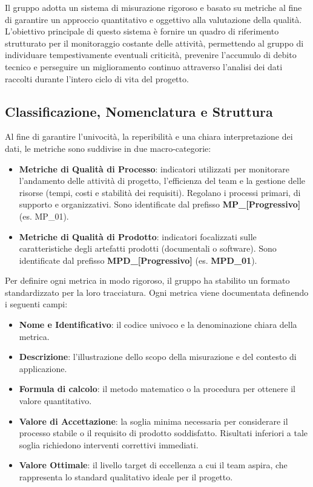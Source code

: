 \documentclass[12pt, a4paper]{article}
\begin{document}
Il gruppo adotta un sistema di misurazione rigoroso e basato su metriche al fine di garantire un approccio quantitativo e oggettivo alla valutazione della qualità. L'obiettivo principale di questo sistema è fornire un quadro di riferimento strutturato per il monitoraggio costante delle attività, permettendo al gruppo di individuare tempestivamente eventuali criticità, prevenire l'accumulo di debito tecnico e perseguire un miglioramento continuo attraverso l'analisi dei dati raccolti durante l'intero ciclo di vita del progetto.

\subsection{Classificazione, Nomenclatura e Struttura}
Al fine di garantire l'univocità, la reperibilità e una chiara interpretazione dei dati, le metriche sono suddivise in due macro-categorie:
\begin{itemize}
    \item \textbf{Metriche di Qualità di Processo}: indicatori utilizzati per monitorare l'andamento delle attività di progetto, l'efficienza del team e la gestione delle risorse (tempi, costi e stabilità dei requisiti). Regolano i processi primari, di supporto e organizzativi. Sono identificate dal prefisso \textbf{MP\_[Progressivo]} (es. MP\_01).
    \item \textbf{Metriche di Qualità di Prodotto}: indicatori focalizzati sulle caratteristiche degli artefatti prodotti (documentali o software). Sono identificate dal prefisso \textbf{MPD\_[Progressivo]} (es. \textbf{MPD\_01}).
\end{itemize}

Per definire ogni metrica in modo rigoroso, il gruppo ha stabilito un formato standardizzato per la loro tracciatura. Ogni metrica viene documentata definendo i seguenti campi:
\begin{itemize}
    \item \textbf{Nome e Identificativo}: il codice univoco e la denominazione chiara della metrica.
    \item \textbf{Descrizione}: l'illustrazione dello scopo della misurazione e del contesto di applicazione.
    \item \textbf{Formula di calcolo}: il metodo matematico o la procedura per ottenere il valore quantitativo.
    \item \textbf{Valore di Accettazione}: la soglia minima necessaria per considerare il processo stabile o il requisito di prodotto soddisfatto. Risultati inferiori a tale soglia richiedono interventi correttivi immediati.
    \item \textbf{Valore Ottimale}: il livello target di eccellenza a cui il team aspira, che rappresenta lo standard qualitativo ideale per il progetto.
\end{itemize}
\end{document}
